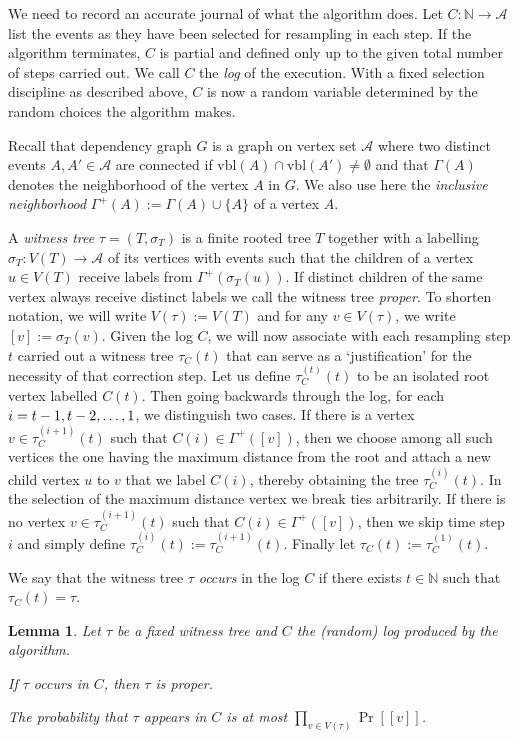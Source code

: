 \documentclass[11pt,a4paper]{article}
\newtheorem{lemma}[theorem]{Lemma}
\DeclareMathOperator*{\pr}{Pr}
\begin{document}
We need to record an accurate journal of what the algorithm does. Let $C : \mathbb{N} \rightarrow
\mathcal{A}$ list the events as they have been selected for resampling in each step. If the algorithm terminates, $C$ is partial and defined only up
to the given total number of steps carried out. We call $C$ the \emph{log} of the execution. With a fixed selection discipline as
described above, $C$ is now a random variable determined by the random choices
the algorithm makes.

Recall that dependency graph $G$ is a graph on vertex set $\mathcal A$ where
two distinct events $A,A'\in\mathcal A$ are connected if
$\mbox{vbl}(A)\cap\mbox{vbl}(A')\ne\emptyset$ and that $\Gamma(A)$ denotes the
neighborhood of the vertex $A$ in $G$. We also use here the
\emph{inclusive neighborhood} $\Gamma^+(A) := \Gamma(A) \cup \{A\}$ of a
vertex $A$.

A \emph{witness tree} $\tau = (T, \sigma_T)$ is a finite rooted tree $T$ together with a labelling $\sigma_T : V(T) \rightarrow \mathcal{A}$ 
of its vertices with events such that the children of a vertex $u \in V(T)$
receive labels from $\Gamma^+(\sigma_T(u))$. If distinct children of the same
vertex always receive distinct labels we call the witness tree \emph{proper}.
To shorten notation, we will write $V(\tau) := V(T)$ and for any $v \in V(\tau)$, we write $[v] := \sigma_T(v)$.
Given the log $C$, we will now associate with each resampling step $t$ carried out a witness tree $\tau_C(t)$ 
that can serve as a `justification' for the necessity of that correction
step. Let us define $\tau_C^{(t)}(t)$ to be an isolated root
vertex labelled $C(t)$. Then going backwards through the log, for each $i=
t-1, t-2, \mathellipsis, 1$, we distinguish two cases. If there
is a vertex $v \in \tau_C^{(i+1)}(t)$ such that $C(i) \in \Gamma^+([v])$,
then we choose among all such vertices the one having the maximum distance
from the root and attach a new child vertex $u$ to $v$ that we label $C(i)$, thereby obtaining
the tree $\tau_C^{(i)}(t)$. In the selection of the maximum distance vertex we
break ties arbitrarily. If there is no vertex $v \in \tau_C^{(i+1)}(t)$ such
that $C(i) \in \Gamma^+([v])$, then we skip time step $i$ and simply define $\tau_C^{(i)}(t) := \tau_C^{(i+1)}(t)$.
Finally let $\tau_C(t) := \tau_C^{(1)}(t)$.

We say that the witness tree $\tau$ \emph{occurs} in the log $C$
if there exists $t \in \mathbb{N}$ such that $\tau_C(t) = \tau$.

\begin{lemma}
\label{coupling}
\renewcommand{\labelenumi}{\roman{enumi}.}
Let $\tau$ be a fixed witness tree and $C$ the (random) log produced by the algorithm.
\begin{description}
 \vspace*{-0.2cm}
 \item[(i)] If $\tau$ occurs in $C$, then $\tau$ is proper.
 \vspace*{-0.2cm}
 \item[(ii)] The probability that $\tau$ appears in $C$ is at most $\prod_{v\in V(\tau)}\pr[[v]]$.
\end{description}
\end{lemma}
\end{document}
